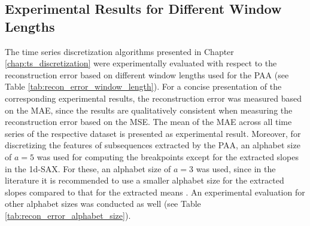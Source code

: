 \subsection*{Experimental Results for Different Window Lengths} \label{findings_different_window_length}
The time series discretization algorithms presented in Chapter \ref{chap:ts_discretization} were experimentally evaluated with respect to the reconstruction error based on different window lengths used for the \ac{PAA} (see Table \ref{tab:recon_error_window_length}). For a concise presentation of the corresponding experimental results, the reconstruction error was measured based on the \ac{MAE}, since the results are qualitatively consistent when measuring the reconstruction error based on the \ac{MSE}. The mean of the MAE across all time series of the respective dataset is presented as experimental result. Moreover, for discretizing the features of subsequences extracted by the \ac{PAA}, an alphabet size of $a = 5$ was used for computing the breakpoints except for the extracted slopes in the \ac{1d-SAX}. For these, an alphabet size of $a = 3$ was used, since in the literature it is recommended to use a smaller alphabet size for the extracted slopes compared to that for the extracted means \cite{1d-SAX}. An experimental evaluation for other alphabet sizes was conducted as well (see Table \ref{tab:recon_error_alphabet_size}).
\newpage
